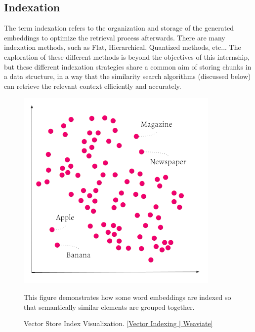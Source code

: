 \subsection{Indexation}
The term indexation refers to the organization and storage of the generated embeddings to optimize the retrieval process afterwards. There are many indexation methods, such as Flat, Hierarchical, Quantized methods, etc... The exploration of these different methods is beyond the objectives of this internship, but these different indexation strategies share a common aim of storing chunks in a data structure, in a way that the similarity search algorithms (discussed below) can retrieve the relevant context efficiently and accurately.
\begin{figure}[H]
    \centering
    \includegraphics[width=.5\linewidth]{./figures/vs-indexation.png}
    \caption{Vector Store Index Visualization. \href{https://weaviate.io/developers/weaviate/concepts/vector-index}{[Vector Indexing | Weaviate]}}
    \begin{flushleft}
        \small This figure demonstrates how some word embeddings are indexed so that semantically similar elements are grouped together.
    \end{flushleft}
\end{figure}
